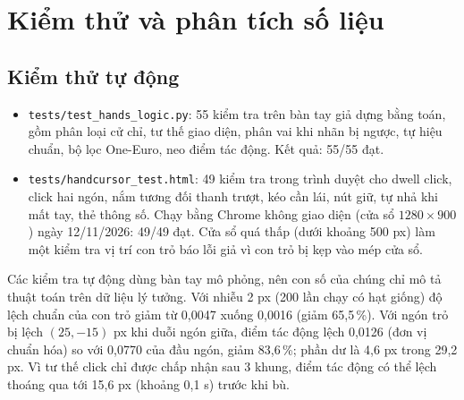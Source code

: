\documentclass[11pt,a4paper]{article}
\newcommand{\code}[1]{\texttt{\small #1}}
\begin{document}
\section{Kiểm thử và phân tích số liệu}\label{sec:verify}
\subsection{Kiểm thử tự động}
\begin{itemize}
  \item \code{tests/test\_hands\_logic.py}: 55 kiểm tra trên bàn tay giả dựng bằng toán, gồm phân loại cử chỉ, tư thế giao diện, phân vai khi nhãn bị ngược, tự hiệu chuẩn, bộ lọc One-Euro, neo điểm tác động. Kết quả: 55/55 đạt.
  \item \code{tests/handcursor\_test.html}: 49 kiểm tra trong trình duyệt cho dwell click, click hai ngón, nắm tương đối thanh trượt, kéo cần lái, nút giữ, tự nhả khi mất tay, thẻ thông số. Chạy bằng Chrome không giao diện (cửa sổ $1280\times900$) ngày 12/11/2026: 49/49 đạt. Cửa sổ quá thấp (dưới khoảng 500 px) làm một kiểm tra vị trí con trỏ báo lỗi giả vì con trỏ bị kẹp vào mép cửa sổ.
\end{itemize}
Các kiểm tra tự động dùng bàn tay mô phỏng, nên con số của chúng chỉ mô tả thuật toán trên dữ liệu lý tưởng. Với nhiễu 2 px (200 lần chạy có hạt giống) độ lệch chuẩn của con trỏ giảm từ 0,0047 xuống 0,0016 (giảm 65,5\,\%). Với ngón trỏ bị lệch $(25,-15)$ px khi duỗi ngón giữa, điểm tác động lệch 0,0126 (đơn vị chuẩn hóa) so với 0,0770 của đầu ngón, giảm 83,6\,\%; phần dư là 4,6 px trong 29,2 px. Vì tư thế click chỉ được chấp nhận sau 3 khung, điểm tác động có thể lệch thoáng qua tới 15,6 px (khoảng 0,1 s) trước khi bù.
\end{document}
